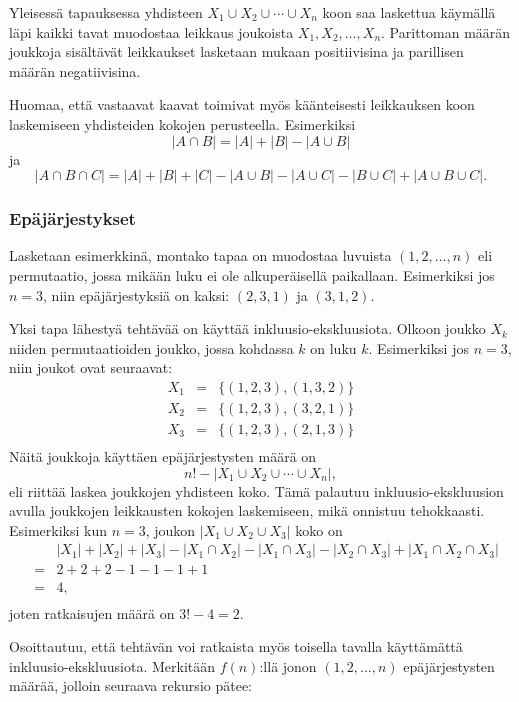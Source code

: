 Yleisessä tapauksessa yhdisteen $X_1 \cup X_2 \cup \cdots \cup X_n$
koon saa laskettua käymällä läpi kaikki tavat muodostaa
leikkaus joukoista $X_1,X_2,\ldots,X_n$.
Parittoman määrän joukkoja sisältävät leikkaukset
lasketaan mukaan positiivisina ja
parillisen määrän negatiivisina.

Huomaa, että vastaavat kaavat toimivat myös käänteisesti
leikkauksen koon laskemiseen yhdisteiden kokojen perusteella.
Esimerkiksi
\[ |A \cap B| = |A| + |B| - |A \cup B|\]
ja
\[ |A \cap B \cap C| = |A| + |B| + |C| - |A \cup B|  - |A \cup C|  - |B \cup C| + |A \cup B \cup C| .\]

\subsubsection{Epäjärjestykset}


Lasketaan esimerkkinä,
montako tapaa on muodostaa luvuista
$(1,2,\ldots,n)$ 
eli permutaatio,
jossa mikään luku ei ole alkuperäisellä paikallaan.
Esimerkiksi jos $n=3$, niin epäjärjestyksiä on kaksi: $(2,3,1)$ ja $(3,1,2)$.

Yksi tapa lähestyä tehtävää on käyttää inkluusio-ekskluusiota.
Olkoon joukko $X_k$ niiden permutaatioiden joukko,
jossa kohdassa $k$ on luku $k$.
Esimerkiksi jos $n=3$, niin joukot ovat seuraavat:
\[
\begin{array}{lcl}
X_1 & = & \{(1,2,3),(1,3,2)\} \\
X_2 & = & \{(1,2,3),(3,2,1)\} \\
X_3 & = & \{(1,2,3),(2,1,3)\} \\
\end{array}
\]
Näitä joukkoja käyttäen epäjärjestysten määrä on
\[ n! - |X_1 \cup X_2 \cup \cdots \cup X_n|, \]
eli
riittää laskea joukkojen yhdisteen koko.
Tämä palautuu inkluusio-eks\-kluu\-sion avulla
joukkojen leikkausten kokojen laskemiseen,
mikä onnistuu tehokkaasti.
Esimerkiksi kun $n=3$, joukon $|X_1 \cup X_2 \cup X_3|$ koko on
\[
\begin{array}{lcl}
 & & |X_1| + |X_2| + |X_3| - |X_1 \cap X_2|  - |X_1 \cap X_3|  - |X_2 \cap X_3| + |X_1 \cap X_2 \cap X_3| \\
 & = & 2+2+2-1-1-1+1 \\
 & = & 4, \\
\end{array}
\]
joten ratkaisujen määrä on $3!-4=2$.

Osoittautuu, että tehtävän voi ratkaista myös toisella
tavalla käyttämättä inkluusio-ekskluusiota.
Merkitään $f(n)$:llä jonon $(1,2,\ldots,n)$ epäjärjestysten määrää,
jolloin seuraava rekursio pätee:

